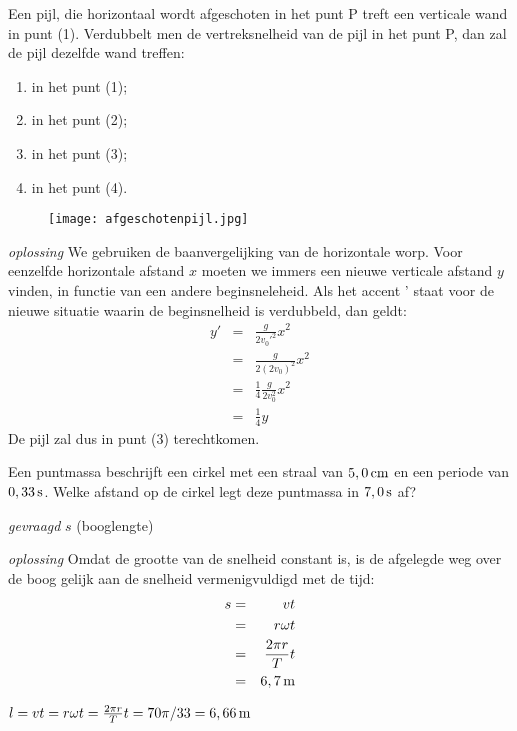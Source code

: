 \documentclass{ximera}
\begin{document}
\begin{exercise} Een pijl, die horizontaal wordt afgeschoten in het punt P
treft een verticale wand in punt (1). Verdubbelt men de
vertreksnelheid van de pijl in het punt P, dan zal de pijl dezelfde
wand treffen:
\begin{enumerate}
\item in het punt (1);
\item in het punt (2);
\item in het punt (3);
\item in het punt (4).
\end{enumerate}
\begin{figure}[h]
\begin{center}
\texttt{[image: afgeschotenpijl.jpg]}
\end{center}
\end{figure}
\begin{oplossing}
\item[\textit{oplossing}]We gebruiken de baanvergelijking van de
horizontale worp. Voor eenzelfde horizontale afstand $x$ moeten we
immers een nieuwe verticale afstand $y$ vinden, in functie van een
andere beginsneleheid. Als het accent ' staat voor de nieuwe
situatie waarin de beginsnelheid is verdubbeld, dan geldt:
\begin{eqnarray*}
y'&=&\frac{g}{2v_0'^2}x^2\\
&=&\frac{g}{2(2v_0)^2}x^2\\
&=&\frac{1}{4}\frac{g}{2v_0^2}x^2\\
&=&\frac{1}{4}y
\end{eqnarray*}
De pijl zal dus in punt (3) terechtkomen.
\end{oplossing}

\end{exercise}

\begin{exercise} Een puntmassa beschrijft een cirkel met een straal van $5,0\rm\,cm$ en een periode van $0,33\rm\,s$. Welke afstand op de cirkel legt deze puntmassa in $7,0\rm\,s$ af?
\begin{oplossing}
\item[\textit{gevraagd}]$s$ (booglengte)
\item[\textit{oplossing}]Omdat de grootte van de snelheid constant is, is de
afgelegde weg over de boog gelijk aan de snelheid vermenigvuldigd met de tijd:
\begin{eqnarray*}
s&=&vt\\
&=&r\omega t\\
&=&\frac{2\pi r}{T}t\\
&=&6,7\rm\,m
\end{eqnarray*}
\end{oplossing}
\begin{oplossing}
$l=vt=r\omega t=\frac{2\pi r}{T}t=70\pi/33=6,66\rm\,m$
\end{oplossing}



\end{exercise}
\end{document}
